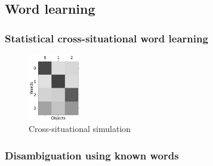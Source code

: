 \documentclass{article} %
\begin{document}
%
%

\subsection{Word learning}

\subsubsection{Statistical cross-situational word learning}

\begin{figure}
  \centering
  \includegraphics[width=0.20\textwidth]{figures/cross-sit.pdf}
  \caption{Cross-situational simulation}
  \label{fig:cross-sit}
\end{figure}

\subsubsection{Disambiguation using known words}

\end{document}
